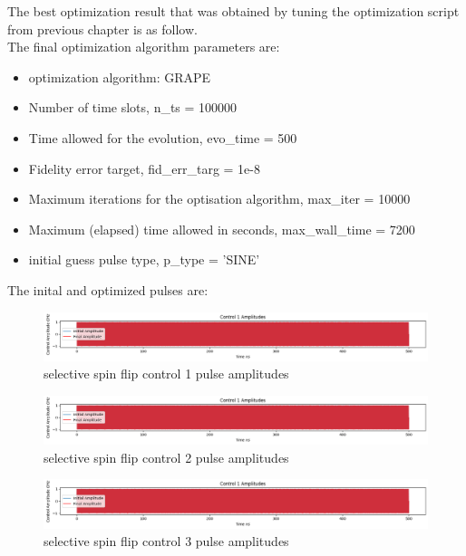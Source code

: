 \documentclass[12pt]{report}
\begin{document}
The best optimization result that was obtained by tuning the optimization script from 
previous chapter is as follow. 
\\
The final optimization algorithm parameters are:
\\ 
\begin{itemize}
    \item optimization algorithm: GRAPE
    \item Number of time slots, n\_ts = 100000
    \item Time allowed for the evolution, evo\_time = 500
    \item Fidelity error target, fid\_err\_targ = 1e-8
    \item Maximum iterations for the optisation algorithm, max\_iter = 10000
    \item Maximum (elapsed) time allowed in seconds, max\_wall\_time = 7200
    \item initial guess pulse type, p\_type = 'SINE'
\end{itemize}

The inital and optimized pulses are: 
\begin{figure}[H]
    \centering
    \includegraphics[width=0.95\linewidth]{selective_spin_flip_GRAPE_control1.png}
    \caption{selective spin flip control 1 pulse amplitudes}
    \label{fig:selective_spin_flip_control1}
\end{figure}
\begin{figure}[H]
    \centering
    \includegraphics[width=0.95\linewidth]{selective_spin_flip_GRAPE_control1.png}
    \caption{selective spin flip control 2 pulse amplitudes}
    \label{fig:selective_spin_flip_control2}
\end{figure}
\begin{figure}[H]
    \centering
    \includegraphics[width=0.95\linewidth]{selective_spin_flip_GRAPE_control1.png}
    \caption{selective spin flip control 3 pulse amplitudes}
    \label{fig:selective_spin_flip_control3}
\end{figure}
\end{document}
